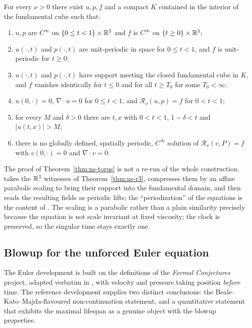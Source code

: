 \begin{theorem}
\label{thm:ns-torus}
For every $\nu>0$ there exist $u,p,f$ and a compact $K$ contained in the interior of the
fundamental cube such that:
\begin{enumerate}[label=\textup{(i\arabic*)}]
  \item $u,p$ are $C^\infty$ on $\{0\le t<1\}\times\mathbb{R}^3$ and $f$ is $C^\infty$ on
        $\{t\ge0\}\times\mathbb{R}^3$;
  \item $u(\cdot,t)$ and $p(\cdot,t)$ are unit-periodic in space for $0\le t<1$, and
        $f$ is unit-periodic for $t\ge0$;
  \item $u(\cdot,t)$ and $p(\cdot,t)$ have support meeting the closed fundamental cube
        in $K$, and $f$ vanishes identically for $t\le 0$ and for all $t\ge T_0$ for
        some $T_0<\infty$;
  \item $u(0,\cdot)=0$, $\nabla\cdot u=0$ for $0\le t<1$, and
        $\mathcal{R}_\nu(u,p)=f$ for $0<t<1$;
  \item for every $M$ and $\delta>0$ there are $t,x$ with $0<t<1$, $1-\delta<t$ and
        $|u(t,x)|>M$;
  \item there is no globally defined, spatially periodic, $C^\infty$ solution of
        $\mathcal{R}_\nu(v,P)=f$ with $v(0,\cdot)=0$ and $\nabla\cdot v=0$.
\end{enumerate}
\end{theorem}

The proof of Theorem~\ref{thm:ns-torus} is not a re-run of the whole construction.
 takes the $\mathbb{R}^3$ witnesses of
Theorem~\ref{thm:ns-r3}, compresses them by an affine parabolic scaling to bring their
support into the fundamental domain, and then reads the resulting fields as periodic
lifts; the ``periodization'' of the equations is the content of
. The scaling is a parabolic rather than a plain
similarity precisely because the equation is not scale invariant at fixed viscosity; the
clock is preserved, so the singular time stays exactly one.

\subsection{Blowup for the unforced Euler equation}
\label{sec:euler}

The Euler development is built on the definitions of the \emph{Formal Conjectures}
project, adapted verbatim in , with velocity and
pressure taking position \emph{before} time. The reference development supplies two
distinct conclusions: the Beale--Kato--Majda-flavoured non-continuation statement, and a
quantitative statement that exhibits the maximal lifespan as a genuine object with the
blowup properties.

